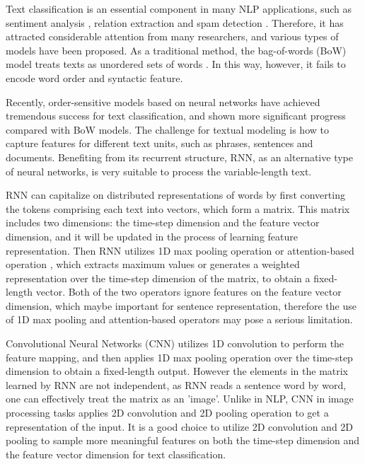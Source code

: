 \documentclass[11pt]{article}
\begin{document}
Text classification is an essential component in many NLP applications, such as sentiment analysis \cite{socher2013recursive}, relation extraction \cite{zeng2014relation} and spam detection \cite{wang2010don}. Therefore, it has attracted considerable attention from many researchers, and various types of models have been proposed. As a traditional method, the bag-of-words (BoW) model treats texts as unordered sets of words \cite{wang2012baselines}. In this way, however, it fails to encode word order and syntactic feature.

Recently, order-sensitive models based on neural networks have achieved tremendous success for text classification, and shown more significant progress compared with BoW models. The challenge for textual modeling is how to capture features for different text units, such as phrases, sentences and documents. Benefiting from its recurrent structure, RNN, as an alternative type of neural networks, is very suitable to process the variable-length text.


RNN can capitalize on distributed representations of words by first converting the tokens comprising each text into vectors, which form a matrix. This matrix includes two dimensions: the time-step dimension and the feature vector dimension, and it will be updated in the process of learning feature representation. 
Then RNN utilizes 1D max pooling operation \cite{lai2015recurrent} or attention-based operation \cite{zhou2016attention}, which extracts maximum values or generates a weighted representation over the time-step dimension of the matrix, to obtain a fixed-length vector. Both of the two operators ignore features on the feature vector dimension, which maybe important for sentence representation, therefore the use of 1D max pooling and attention-based operators may pose a serious limitation. 








Convolutional Neural Networks (CNN) \cite{kalchbrenner2014convolutional,kim2014convolutional} utilizes 1D convolution to perform the feature mapping, and then applies 1D max pooling operation over the time-step dimension to obtain a fixed-length output. However the elements in the matrix learned by RNN are not independent, as RNN reads a sentence word by word, one can effectively treat the matrix as an 'image'. Unlike in NLP, CNN in image processing tasks \cite{lecun1998gradient,krizhevsky2012imagenet} applies 2D convolution and 2D pooling operation to get a representation of the input. It is a good choice to utilize 2D convolution and 2D pooling to sample more meaningful features on both the time-step dimension and the feature vector dimension for text classification.
\end{document}
